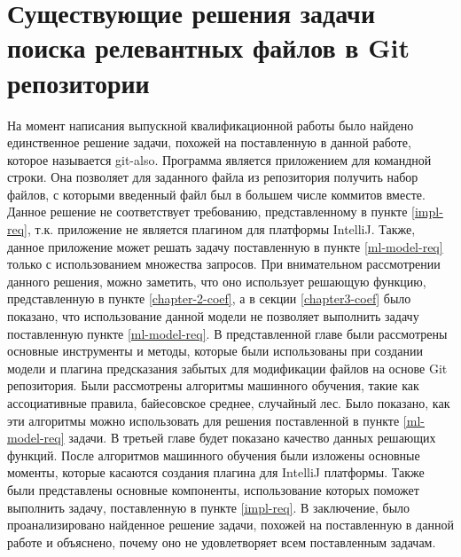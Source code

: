 \section{Существующие решения задачи поиска релевантных файлов в Git репозитории}
На момент написания выпускной квалификационной работы было найдено единственное решение задачи, похожей на поставленную в данной работе, которое называется git-also\cite{git-also-anvaka}. Программа является приложением для командной строки. Она позволяет для заданного файла из репозитория получить набор файлов, с которыми введенный файл был в большем числе коммитов вместе. Данное решение не соответствует требованию, представленному в пункте \ref{impl-req}, т.к. приложение не является плагином для платформы IntelliJ. Также, данное приложение может решать задачу поставленную в пункте \ref{ml-model-req} только с использованием множества запросов. При внимательном рассмотрении данного решения, можно заметить, что оно использует решающую функцию, представленную в пункте \ref{chapter-2-coef}, а в секции \ref{chapter3-coef} было показано, что использование данной модели не позволяет выполнить задачу поставленную пункте \ref{ml-model-req}.
\chapterconclusion
В представленной главе были рассмотрены основные инструменты и методы, которые были использованы при создании модели и плагина предсказания забытых для модификации файлов на основе Git репозитория. Были рассмотрены алгоритмы машинного обучения, такие как ассоциативные правила, байесовское среднее, случайный лес. Было показано, как эти алгоритмы можно использовать для решения поставленной в пункте \ref{ml-model-req} задачи. В третьей главе будет показано качество данных решающих функций. После алгоритмов машинного обучения были изложены основные моменты, которые касаются создания плагина для IntelliJ платформы. Также были представлены основные компоненты, использование которых поможет выполнить задачу, поставленную в пункте \ref{impl-req}. В заключение, было проанализировано найденное решение задачи, похожей на поставленную в данной работе и объяснено, почему оно не удовлетворяет всем поставленным задачам.